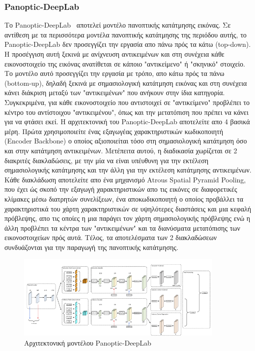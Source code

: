 \documentclass[12pt]{article}
\numberwithin{equation}{section}
\begin{document}
\subsubsection{Panoptic-DeepLab}

Το Panoptic-DeepLab~\cite{cheng2020panopticdeeplabsimplestrongfast} αποτελεί μοντέλο πανοπτικής κατάτμησης εικόνας. Σε αντίθεση με τα περισσότερα μοντέλα πανοπτικής κατάτμησης της περιόδου αυτής, το Panoptic-DeepLab δεν προσεγγίζει την εργασία απο πάνω πρός τα κάτω (top-down). Η προσέγγιση αυτή ξεκινά με ανίχνευση αντικειμένων και στη συνέχεια κάθε εικονοστοιχείο της εικόνας ανατίθεται σε κάποιο "αντικείμενο" ή "σκηνικό" στοιχείο. Το μοντέλο αυτό προσεγγίζει την εργασία με τρόπο, απο κάτω πρός τα πάνω (bottom-up), δηλαδή ξεκινά με σημασιολογική κατάτμηση εικόνας και στη συνέχεια κάνει διάκριση μεταξύ των "αντικειμένων" που ανήκουν στην ίδια κατηγορία. Συγκεκριμένα, για κάθε εικονοστοιχείο που αντιστοιχεί σε "αντικείμενο" προβλέπει το κέντρο του αντίστοιχου "αντικειμένου", όπως και την μετατόπιση που πρέπει να κάνει για να φτάσει εκεί. Η αρχιτεκτονική του Panoptic-DeepLab αποτελείτε απο 4 βασικά μέρη. Πρώτα χρησιμοποιείτε ένας εξαγωγέας χαρακτηριστικών κωδικοποιητή (Encoder Backbone) ο οποίος αξιοποιείται τόσο στη σημασιολογική κατάτμηση όσο και στην κατάτμηση αντικειμένων. Μετέπειτα αυτού, η διαδικασία χωρίζεται σε 2 διακριτές διακλαδώσεις, με την μία να είναι υπέυθυνη για την εκτέλεση σημασιολογικής κατάτμησης και την άλλη για την εκτέλεση κατάτμησης αντικειμένων. Κάθε διακλάδωση αποτελείτε απο ένα μηχανισμό Atrous Spatial Pyramid Pooling, που έχει ώς σκοπό την εξαγωγή χαρακτηριστικών απο τις εικόνες σε διαφορετικές κλίμακες μέσω διατρητών συνελίξεων, ένα αποκωδικοποιητή ο οποίος προβάλλει τα χαρακτηριστικά του χάρτη χαρακτηριστικών σε υψηλότερες διαστάσεις και μια κεφαλή πρόβλεψης, απο τις οποίες η μια παράγει τον χάρτη σημασιολογικής πρόβλεψης ενώ η άλλη προβλέπει τα κέντρα των "αντικειμένων" και τα διανύσματα μετατόπισης των εικονοστοιχείων πρός αυτά. Τέλος, τα αποτελέσματα των 2 διακλαδώσεων συνδυάζονται για την παραγωγή της πανοπτικής κατάτμησης. \\

\begin{figure}[h!]
  \centering
  \includegraphics[width=0.9\textwidth]{images/Panoptic-DeepLab.png} %
  \caption{Αρχιτεκτονική μοντέλου Panoptic-DeepLab}
  \label{figure 20}
\end{figure} 
\end{document}
